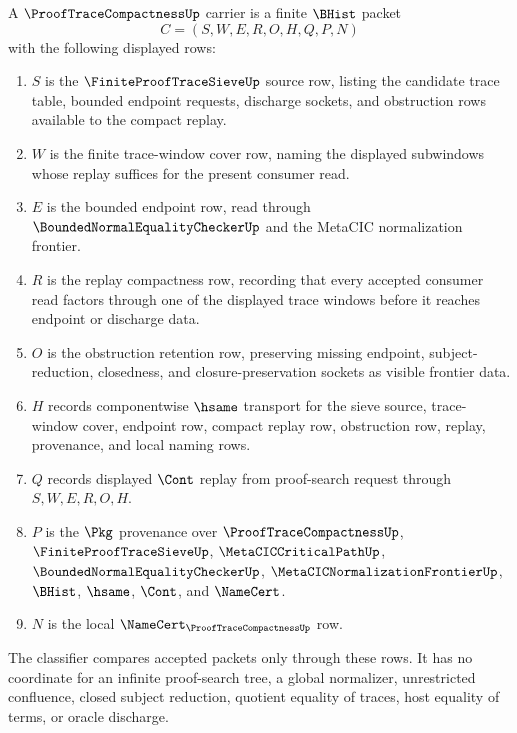 \begin{definition}
\label{def:proof-trace-compactness-carrier}
A $\ProofTraceCompactnessUp$ carrier is a finite $\BHist$ packet
$$
C=(S,W,E,R,O,H,Q,P,N)
$$
with the following displayed rows:
\begin{enumerate}
\item $S$ is the $\FiniteProofTraceSieveUp$ source row, listing the candidate trace table, bounded endpoint requests, discharge sockets, and obstruction rows available to the compact replay.
\item $W$ is the finite trace-window cover row, naming the displayed subwindows whose replay suffices for the present consumer read.
\item $E$ is the bounded endpoint row, read through $\BoundedNormalEqualityCheckerUp$ and the MetaCIC normalization frontier.
\item $R$ is the replay compactness row, recording that every accepted consumer read factors through one of the displayed trace windows before it reaches endpoint or discharge data.
\item $O$ is the obstruction retention row, preserving missing endpoint, subject-reduction, closedness, and closure-preservation sockets as visible frontier data.
\item $H$ records componentwise $\hsame$ transport for the sieve source, trace-window cover, endpoint row, compact replay row, obstruction row, replay, provenance, and local naming rows.
\item $Q$ records displayed $\Cont$ replay from proof-search request through $S,W,E,R,O,H$.
\item $P$ is the $\Pkg$ provenance over $\ProofTraceCompactnessUp$, $\FiniteProofTraceSieveUp$, $\MetaCICCriticalPathUp$, $\BoundedNormalEqualityCheckerUp$, $\MetaCICNormalizationFrontierUp$, $\BHist$, $\hsame$, $\Cont$, and $\NameCert$.
\item $N$ is the local $\NameCert_{\ProofTraceCompactnessUp}$ row.
\end{enumerate}
The classifier compares accepted packets only through these rows. It has no coordinate for an infinite proof-search tree, a global normalizer, unrestricted confluence, closed subject reduction, quotient equality of traces, host equality of terms, or oracle discharge.
\end{definition}

